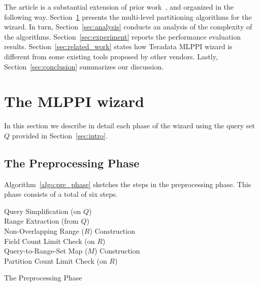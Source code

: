 \documentclass[paper]{ieice}
\begin{document}
The article is a substantial extension of prior work~\cite{Suh12}, 
and organized in the following way. 
Section~\ref{sec:algorithms} presents the multi-level \hbox{partitioning} 
algorithms for the wizard. 
In turn, Section~\ref{sec:analysis} conducts an analysis of the complexity of 
the algorithms. 
Section~\ref{sec:experiment} reports the performance evaluation results. 
Section~\ref{sec:related_work} states how \hbox{Teradata} MLPPI wizard 
is different from some existing tools proposed by other vendors. 
Lastly, Section~\ref{sec:conclusion} summarizes our discussion.


\section{The MLPPI wizard}
\label{sec:algorithms}

In this section we describe in detail each phase of the wizard using the query set $Q$ provided in Section~\ref{sec:intro}. 

\subsection{The Preprocessing Phase}
\label{sec:pre_phase}

Algorithm~\ref{algo:pre_phase} sketches 
the steps in the preprocessing phase. 
This phase consists of a total of six steps. 

\vspace{-.1in}

\begin{algorithm}	
{
\hspace{.05in} Query Simplification (on $Q$)\\
\hspace{.05in} Range Extraction (from $Q$) \\
\hspace{.05in} Non-Overlapping Range ($R$) Construction \\
\hspace{.05in} Field Count Limit Check (on $R$) \\
\hspace{.05in} Query-to-Range-Set Map ($M$) Construction \\
\hspace{.05in} Partition Count Limit Check (on $R$) \\
}
\caption{The Preprocessing Phase}
\label{algo:pre_phase}
\end{algorithm}
\end{document}
